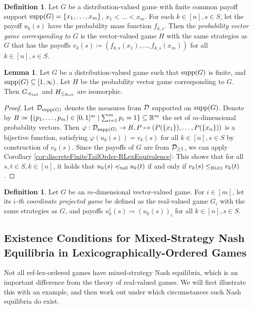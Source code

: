 \documentclass[a4paper]{scrreprt}
\let\phi\varphi
\theoremstyle{definition}
\newtheorem{lemma}[thm]{Lemma} %
\newtheorem{defn}[thm]{Definition} %
\begin{document}
    \begin{defn}
        Let $G$ be a distribution-valued game with finite common payoff support $\operatorname{supp}(G) = \{x_1, \dots, x_m\}$, $x_1 < \dots < x_m$.
        For each $k \in [n], s \in S$, let the payoff $u_k(s)$ have the probability mass function $f_{k, s}$.
        Then the \emph{probability vector game corresponding to $G$} is the vector-valued game $H$ with the same strategies as $G$ that has the payoffs $v_k(s) \coloneqq (f_{k, s}(x_1), \dots, f_{k, s}(x_m))$ for all $k \in [n], s \in S$.
    \end{defn}

    \begin{lemma}
        Let $G$ be a distribution-valued game such that $\operatorname{supp}(G)$ is finite, and $\operatorname{supp}(G) \subseteq [1, \infty)$.
        Let $H$ be the probability vector game corresponding to $G$.
        Then  $G_{\preccurlyeq_{\text{tail}}}$ and $H_{\leq_{\textsc{Rlex}}}$ are isomorphic.
    \end{lemma}
    \begin{proof}
        Let $\mathcal{D}_{\operatorname{supp}(G)}$ denote the measures from $\mathcal{D}$ supported on $\operatorname{supp}(G)$.
        Denote by $B \coloneqq \{(p_1, \dots, p_m) \in [0, 1]^m \mid \sum_{i=1}^{m} p_i = 1\} \subseteq \mathbb{R}^m$ the set of $m$-dimensional probability vectors.
        Then $\phi: \DP_{\supp(G)} \to B, P \mapsto (P(\set{x_1}), \dots, P(\set{x_n}))$ is a bijective function, satisfying $\phi(u_k(s)) = v_k(s)$ for all $k \in [n], s \in S$ by construction of $v_k(s)$.
        Since the payoffs of $G$ are from $\mathcal{D}_{\geq 1}$, we can apply Corollary \ref{cor:discreteFiniteTailOrder-RLexEquivalence}:
        This shows that for all $s, t \in S, k \in [n]$, it holds that $u_k(s) \preccurlyeq_{\text{tail}} u_k(t)$ if and only if $v_k(s) \leq_{\textsc{Rlex}} v_k(t)$.
    
    \end{proof}

    \begin{defn}
        Let $G$ be an $m$-dimensional vector-valued game. For $i \in [m]$, let its \emph{$i$-th coordinate projected game}
        be defined as the real-valued game $G_i$ with the same strategies as $G$, and payoffs
        $u^i_k(s) \coloneqq (u_k(s))_i$ for all $k \in [n], s \in S$.
    \end{defn}

    \subsection{Existence Conditions for Mixed-Strategy Nash Equilibria in Lexicographically-Ordered Games}
    Not all ref-lex-ordered games have mixed-strategy Nash equilibria, which is an important difference from the theory of real-valued games. We will first illustrate this with an example, and then work out under which circumstances such Nash equilibria do exist.
    
\end{document}
